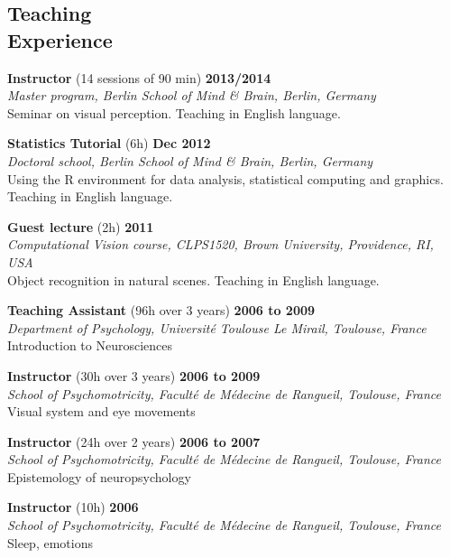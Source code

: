 \documentclass[margin,line]{resume}
\begin{document}
\begin{resume}
	\vspace{3mm}
    \section{\mysidestyle Teaching\\Experience}
    
   	 \textbf{Instructor} (14 sessions of 90 min) \hfill \textbf{2013/2014}\\
	\textsl{Master program, Berlin School of Mind \& Brain, Berlin, Germany}\\
	Seminar on visual perception. Teaching in English language.
	
    	\textbf{Statistics Tutorial} (6h) \hfill \textbf{Dec 2012}\\
	\textsl{Doctoral school, Berlin School of Mind \& Brain, Berlin, Germany}\\
	Using the R environment for data analysis, statistical computing and graphics. Teaching in English language.

	\textbf{Guest lecture} (2h) \hfill \textbf{2011}\\
	\textsl{Computational Vision course, CLPS1520, Brown University, Providence, RI, USA}\\
	Object recognition in natural scenes. Teaching in English language.

	\textbf{Teaching Assistant} (96h over 3 years) \hfill \textbf{2006 to 2009}\\
	\textsl{Department of Psychology, Université Toulouse Le Mirail, Toulouse, France}\\
	Introduction to Neurosciences

	\textbf{Instructor} (30h over 3 years) \hfill \textbf{2006 to 2009}\\
	\textsl{School of Psychomotricity, Faculté de Médecine de Rangueil, Toulouse, France}\\
	Visual system and eye movements

\newpage

	\textbf{Instructor} (24h over 2 years) \hfill \textbf{2006 to 2007}\\
	\textsl{School of Psychomotricity, Faculté de Médecine de Rangueil, Toulouse, France}\\
	Epistemology of neuropsychology



	\textbf{Instructor} (10h) \hfill \textbf{2006}\\
	\textsl{School of Psychomotricity, Faculté de Médecine de Rangueil, Toulouse, France}\\
	Sleep, emotions



\end{resume}
\end{document}

